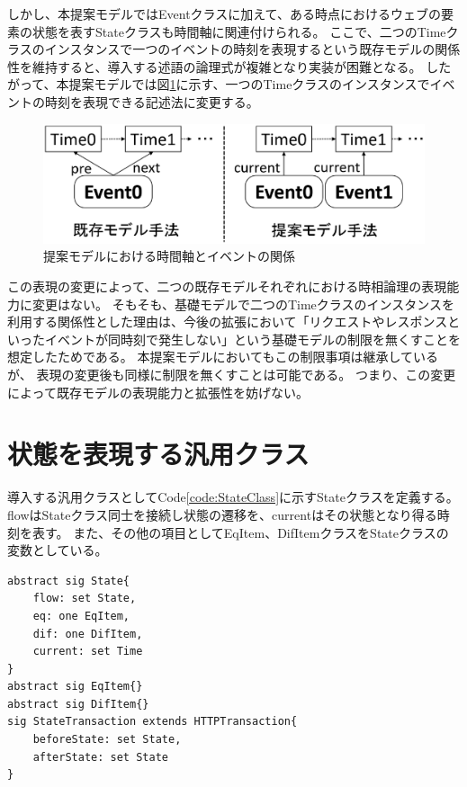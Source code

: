 \documentclass[12pt,a4paper]{jbook}
\begin{document}
しかし、本提案モデルではEventクラスに加えて、ある時点におけるウェブの要素の状態を表すStateクラスも時間軸に関連付けられる。
ここで、二つのTimeクラスのインスタンスで一つのイベントの時刻を表現するという既存モデルの関係性を維持すると、導入する述語の論理式が複雑となり実装が困難となる。
したがって、本提案モデルでは図\ref{fig:ProposedModel-TimeClass}に示す、一つのTimeクラスのインスタンスでイベントの時刻を表現できる記述法に変更する。

\begin{figure}[htb]
\centering
\includegraphics[width=450pt]{./fig/ProposedModel-TimeClass.eps}
\caption{提案モデルにおける時間軸とイベントの関係}
\label{fig:ProposedModel-TimeClass}
\end{figure}

この表現の変更によって、二つの既存モデルそれぞれにおける時相論理の表現能力に変更はない。
そもそも、基礎モデルで二つのTimeクラスのインスタンスを利用する関係性とした理由は、今後の拡張において「リクエストやレスポンスといったイベントが同時刻で発生しない」という基礎モデルの制限を無くすことを想定したためである。
本提案モデルにおいてもこの制限事項は継承しているが、
\color{red}
表現の変更後も同様に制限を無くすことは可能である。
\color{black}
つまり、この変更によって既存モデルの表現能力と拡張性を妨げない。

\section{状態を表現する汎用クラス}
導入する汎用クラスとしてCode\ref{code:StateClass}に示すStateクラスを定義する。
flowはStateクラス同士を接続し状態の遷移を、currentはその状態となり得る時刻を表す。
また、その他の項目としてEqItem、DifItemクラスをStateクラスの変数としている。
\begin{lstlisting}[caption=Stateクラス, label=code:StateClass]
abstract sig State{
	flow: set State,
	eq: one EqItem,
	dif: one DifItem,
	current: set Time
}
abstract sig EqItem{}
abstract sig DifItem{}
sig StateTransaction extends HTTPTransaction{
	beforeState: set State,
	afterState: set State
}
\end{lstlisting}
\end{document}
